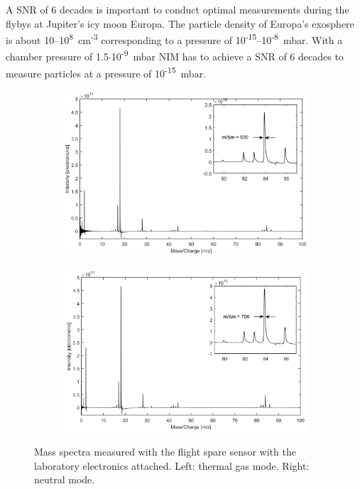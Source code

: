 		A SNR of 6 decades is important to conduct optimal measurements during the flybys at Jupiter's icy moon Europa. The particle density of Europa's exosphere is about 10--10\textsuperscript{8}~cm\textsuperscript{-3} \cite{Vorburger_2018} corresponding to a pressure of 10\textsuperscript{-15}--10\textsuperscript{-8}~mbar. With a chamber pressure of 1.5$\cdot$10\textsuperscript{-9}~mbar NIM has to achieve a SNR of 6 decades to measure particles at a pressure of 10\textsuperscript{-15}~mbar.
		\begin{figure}[h]
			\begin{subfigure}{0.5\textwidth}
				\centering
				\includegraphics[width = \textwidth]{Experiments/FSLabthMode.png}
			\end{subfigure}
			\begin{subfigure}{0.5\textwidth}
				\centering
				\includegraphics[width = \textwidth]{Experiments/FSLabnMode.png}
			\end{subfigure}
			\caption{Mass spectra measured with the flight spare sensor with the laboratory electronics attached. Left: thermal gas mode. Right: neutral mode.}
			\label{fig:ExpFSFlightSenMassRes}
		\end{figure}
